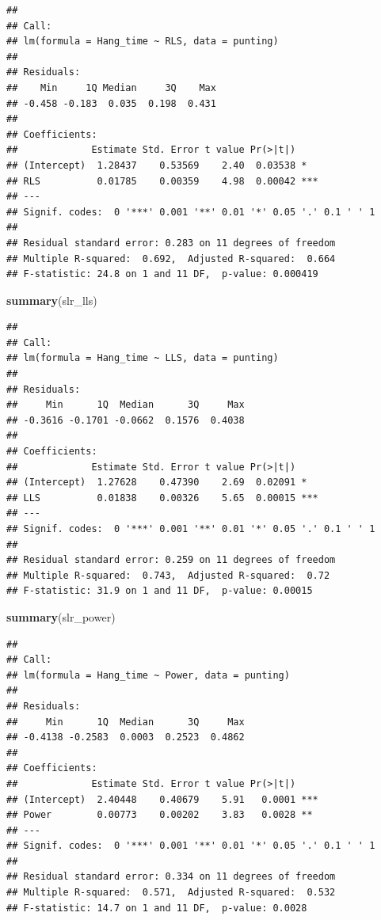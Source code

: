 \documentclass[
]{book}
\newenvironment{Shaded}{\begin{snugshade}}{\end{snugshade}}
\newcommand{\FunctionTok}[1]{\textcolor[rgb]{0.13,0.29,0.53}{\textbf{#1}}}
\newcommand{\NormalTok}[1]{#1}
\begin{document}
\begin{verbatim}
## 
## Call:
## lm(formula = Hang_time ~ RLS, data = punting)
## 
## Residuals:
##    Min     1Q Median     3Q    Max 
## -0.458 -0.183  0.035  0.198  0.431 
## 
## Coefficients:
##             Estimate Std. Error t value Pr(>|t|)    
## (Intercept)  1.28437    0.53569    2.40  0.03538 *  
## RLS          0.01785    0.00359    4.98  0.00042 ***
## ---
## Signif. codes:  0 '***' 0.001 '**' 0.01 '*' 0.05 '.' 0.1 ' ' 1
## 
## Residual standard error: 0.283 on 11 degrees of freedom
## Multiple R-squared:  0.692,  Adjusted R-squared:  0.664 
## F-statistic: 24.8 on 1 and 11 DF,  p-value: 0.000419
\end{verbatim}

\begin{Shaded}
\begin{Highlighting}[]
\FunctionTok{summary}\NormalTok{(slr\_lls)}
\end{Highlighting}
\end{Shaded}

\begin{verbatim}
## 
## Call:
## lm(formula = Hang_time ~ LLS, data = punting)
## 
## Residuals:
##     Min      1Q  Median      3Q     Max 
## -0.3616 -0.1701 -0.0662  0.1576  0.4038 
## 
## Coefficients:
##             Estimate Std. Error t value Pr(>|t|)    
## (Intercept)  1.27628    0.47390    2.69  0.02091 *  
## LLS          0.01838    0.00326    5.65  0.00015 ***
## ---
## Signif. codes:  0 '***' 0.001 '**' 0.01 '*' 0.05 '.' 0.1 ' ' 1
## 
## Residual standard error: 0.259 on 11 degrees of freedom
## Multiple R-squared:  0.743,  Adjusted R-squared:  0.72 
## F-statistic: 31.9 on 1 and 11 DF,  p-value: 0.00015
\end{verbatim}

\begin{Shaded}
\begin{Highlighting}[]
\FunctionTok{summary}\NormalTok{(slr\_power)}
\end{Highlighting}
\end{Shaded}

\begin{verbatim}
## 
## Call:
## lm(formula = Hang_time ~ Power, data = punting)
## 
## Residuals:
##     Min      1Q  Median      3Q     Max 
## -0.4138 -0.2583  0.0003  0.2523  0.4862 
## 
## Coefficients:
##             Estimate Std. Error t value Pr(>|t|)    
## (Intercept)  2.40448    0.40679    5.91   0.0001 ***
## Power        0.00773    0.00202    3.83   0.0028 ** 
## ---
## Signif. codes:  0 '***' 0.001 '**' 0.01 '*' 0.05 '.' 0.1 ' ' 1
## 
## Residual standard error: 0.334 on 11 degrees of freedom
## Multiple R-squared:  0.571,  Adjusted R-squared:  0.532 
## F-statistic: 14.7 on 1 and 11 DF,  p-value: 0.0028
\end{verbatim}
\end{document}
